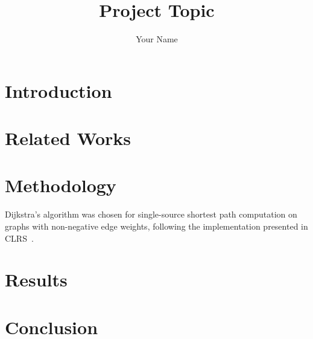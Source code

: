 \documentclass[12pt]{article}
\title{\textbf{Project Topic}}
\author{Your Name}
\begin{document}
\maketitle

\section{Introduction}

\section{Related Works}

\section{Methodology}
Dijkstra's algorithm was chosen for single-source shortest path computation on graphs with non-negative edge weights, following the implementation presented in CLRS~\cite{clrsAlgorithms}.

\section{Results}

\section{Conclusion}



\end{document}
